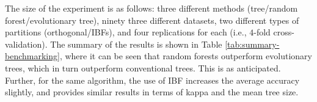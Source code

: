 \documentclass[]{elsarticle} %
\begin{document}
\begin{table}

\caption{\label{tab:summary}\label{tab:summary-benchmarking}Summary of Benchmarking Experiment}
\centering
{}
\end{table}

The size of the experiment is as follows: three different methods
(tree/random forest/evolutionary tree), ninety three different datasets,
two different types of partitions (orthogonal/IBFs), and four
replications for each (i.e., \(4\)-fold cross-validation). The summary
of the results is shown in Table \ref{tab:summary-benchmarking}, where
it can be seen that random forests outperform evolutionary trees, which
in turn outperform conventional trees. This is as anticipated. Further,
for the same algorithm, the use of IBF increases the average accuracy
slightly, and provides similar results in terms of kappa and the mean
tree size.
\end{document}
